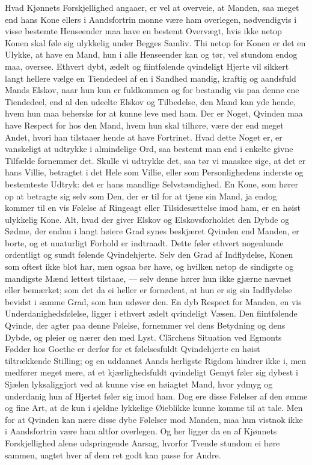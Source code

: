 \documentclass[12pt,a4paper]{book}
\newcommand{\apage}[1]{\marginnote{\footnotesize\textit{[#1]}}}
\begin{document}
Hvad Kjønnets Forskjellighed angaaer, er vel at overveie, at Manden, saa
meget end hans Kone ellers i Aandsfortrin monne være ham overlegen,
nødvendigvis i visse bestemte Henseender maa have en bestemt Overvægt,
hvis ikke netop Konen skal føle sig ulykkelig under Begges Samliv. Thi
netop for Konen er det en Ulykke, at have en Mand, hun i alle Henseender
kan og tør, vel stundom endog maa, oversee. Ethvert dybt, ædelt og
fiintfølende qvindeligt Hjerte vil sikkert langt hellere vælge en
Tiendedeel af en i Sandhed mandig, kraftig og aandsfuld Mands Elskov,
naar hun kun er fuldkommen og for bestandig vis paa denne ene
Tiendedeel, end al den udeelte Elskov og Tilbedelse, den Mand kan yde
hende, hvem hun maa beherske for at \apage{88} kunne leve med ham. Der er Noget,
Qvinden maa have Respect for hos den Mand, hvem hun skal tilhøre, være
der end meget Andet, hvori han tilstaaer hende at have Fortrinet. Hvad
dette Noget er, er vanskeligt at udtrykke i almindelige Ord, saa bestemt
man end i enkelte givne Tilfælde fornemmer det. Skulle vi udtrykke det,
saa tør vi maaskee sige, at det er hans Villie, betragtet i det Hele som
Villie, eller som Personlighedens inderste og bestemteste Udtryk: det er
hans mandlige Selvstændighed. En Kone, som hører op at betragte sig selv
som Den, der er til for at tjene sin Mand, ja endog kommer til en vis
Følelse af Ringeagt eller Tilsidesættelse imod ham, er en høist
ulykkelig Kone. Alt, hvad der giver Elskov og Elskovsforholdet den Dybde
og Sødme, der endnu i langt høiere Grad synes beskjæret Qvinden end
Manden, er borte, og et unaturligt Forhold er indtraadt. Dette føler
ethvert nogenlunde ordentligt og sundt følende Qvindehjerte. Selv den
Grad af Indflydelse, Konen som oftest ikke blot har, men ogsaa bør have,
og hvilken netop de sindigste og mandigste Mænd lettest tilstaae, ---
selv denne hører hun ikke gjærne nævnet eller bemærket; som det da ei
heller er fornødent, at hun er sig sin Indflydelse bevidst i samme Grad,
som hun udøver den. En dyb Respect for Manden, en vis
Underdanighedsfølelse, ligger i ethvert ædelt qvindeligt Væsen. Den
fiintfølende Qvinde, der agter paa denne Følelse, fornemmer vel dens
Betydning og dens Dybde, og pleier og nærer \apage{89} den med Lyst. Clärchens
Situation ved Egmonts Fødder hos Goethe er derfor for et følelsesfuldt
Qvindehjerte en høist tiltrækkende Stilling; og en uddannet Aands
herligste Rigdom hindrer ikke i, men medfører meget mere, at et
kjærlighedsfuldt qvindeligt Gemyt føler sig dybest i Sjælen
lyksaliggjort ved at kunne vise en høiagtet Mand, hvor ydmyg og
underdanig hun af Hjertet føler sig imod ham. Dog ere disse Følelser af
den ømme og fine Art, at de kun i sjeldne lykkelige Øieblikke kunne
komme til at tale. Men for at Qvinden kan nære disse dybe Følelser mod
Manden, maa hun vistnok ikke i Aandsfortrin være ham altfor overlegen.
Og her ligger da en af Kjønnets Forskjellighed alene udspringende
Aarsag, hvorfor Tvende stundom ei høre sammen, uagtet hver af dem ret
godt kan passe for Andre.
\end{document}
